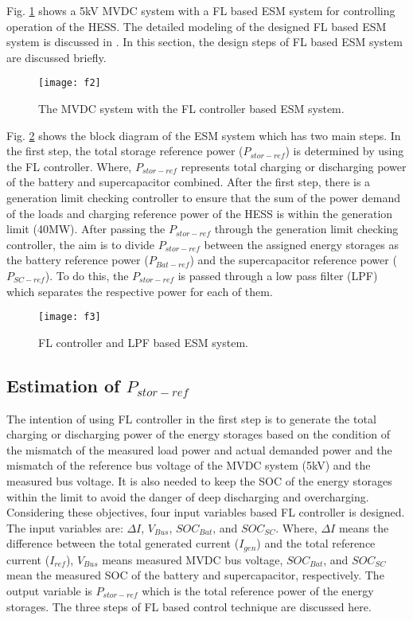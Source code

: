 Fig. \ref{sec3_f2} shows a 5kV MVDC system with a FL based ESM system for controlling operation of the HESS. The detailed modeling of the designed FL based ESM system is discussed in \cite{khan2017fuzzy}. In this section, the design steps of FL based ESM system are discussed briefly.
\begin{figure}[ht!]
\centering
\texttt{[image: f2]}
\caption{The MVDC system with the FL controller based ESM system.}
\label{sec3_f2}
\end{figure} 

Fig. \ref{sec3_f3} shows the block diagram of the ESM system which has two main steps. In the first step, the total storage reference power ($P_{stor-ref}$) is determined by using the FL controller. Where, $P_{stor-ref}$ represents total charging or discharging power of the battery and supercapacitor combined. After the first step, there is a generation limit checking controller to ensure that the sum of the power demand of the loads and charging reference power of the HESS is within the generation limit (40MW). After passing the $P_{stor-ref}$ through the generation limit checking controller, the aim is to divide $P_{stor-ref}$ between the assigned energy storages as the battery reference power ($P_{Bat-ref}$) and the supercapacitor reference power ($P_{SC-ref}$). To do this, the $P_{stor-ref}$ is passed through a low pass filter (LPF) which separates the respective power for each of them.
\begin{figure}[ht!]
\centering
\texttt{[image: f3]}
\caption{FL controller and LPF based ESM system.}
\label{sec3_f3}
\end{figure}
\subsection{Estimation of $P_{stor-ref}$}
The intention of using FL controller in the first step is to generate the total charging or discharging power of the energy storages based on the condition of the mismatch of the measured load power and actual demanded power and the mismatch of the reference bus voltage of the MVDC system (5kV) and the measured bus voltage. It is also needed to keep the SOC of the energy storages within the limit to avoid the danger of deep discharging and overcharging. Considering these objectives, four input variables based FL controller is designed. The input variables are: $\Delta I$, $V_{Bus}$, $SOC_{Bat}$, and $SOC_{SC}$. Where, $\Delta I$ means the difference between the total generated current ($I_{gen}$) and the total reference current ($I_{ref}$), $V_{Bus}$ means measured MVDC bus voltage, $SOC_{Bat}$, and $SOC_{SC}$ mean the measured SOC of the battery and supercapacitor, respectively. The output variable is $P_{stor-ref}$ which is the total reference power of the energy storages. The three steps of FL based control technique are discussed here. 

